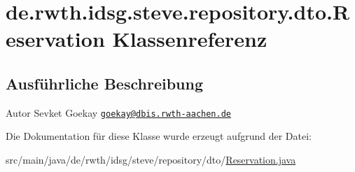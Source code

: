 \hypertarget{classde_1_1rwth_1_1idsg_1_1steve_1_1repository_1_1dto_1_1_reservation}{\section{de.\-rwth.\-idsg.\-steve.\-repository.\-dto.\-Reservation Klassenreferenz}
\label{classde_1_1rwth_1_1idsg_1_1steve_1_1repository_1_1dto_1_1_reservation}
}


\subsection{Ausführliche Beschreibung}
\begin{DoxyAuthor}{Autor}
Sevket Goekay \href{mailto:goekay@dbis.rwth-aachen.de}{\tt goekay@dbis.\-rwth-\/aachen.\-de} 
\end{DoxyAuthor}


Die Dokumentation für diese Klasse wurde erzeugt aufgrund der Datei\-:\begin{DoxyCompactItemize}
\item 
src/main/java/de/rwth/idsg/steve/repository/dto/\hyperlink{_reservation_8java}{Reservation.\-java}\end{DoxyCompactItemize}
